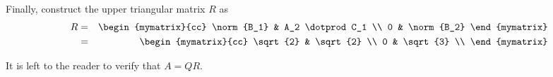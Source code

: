 \begin{solution}
Finally, construct the upper triangular matrix $R$ as 
\begin{eqnarray*}
R &=& 
\begin{mymatrix}{cc}
\norm{B_1} & A_2 \dotprod C_1  \\
0 & \norm{B_2}
\end{mymatrix} \\
&=& 
\begin{mymatrix}{cc}
\sqrt{2} & \sqrt{2} \\
0 & \sqrt{3} \\
\end{mymatrix}
\end{eqnarray*}

It is left to the reader to verify that $A=QR$. 
\end{solution}
